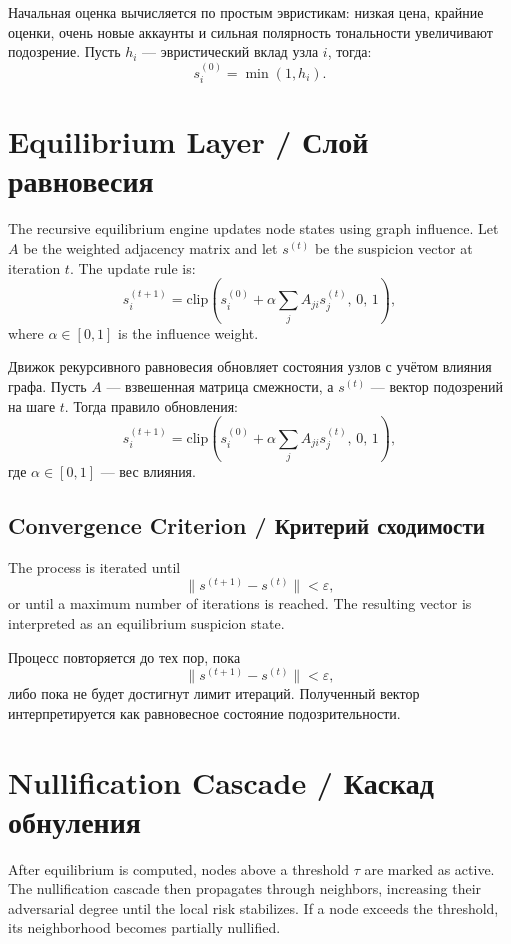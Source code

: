 \documentclass[12pt,a4paper]{article}
\begin{document}
Начальная оценка вычисляется по простым эвристикам:
низкая цена, крайние оценки, очень новые аккаунты и сильная полярность тональности увеличивают подозрение. Пусть $h_i$ — эвристический вклад узла $i$, тогда:
\[
s_i^{(0)} = \min(1, h_i).
\]

\section{Equilibrium Layer / Слой равновесия}

The recursive equilibrium engine updates node states using graph influence. Let $A$ be the weighted adjacency matrix and let $s^{(t)}$ be the suspicion vector at iteration $t$. The update rule is:
\[
s_i^{(t+1)} = \mathrm{clip}\left(s_i^{(0)} + \alpha \sum_j A_{ji}s_j^{(t)},\,0,\,1\right),
\]
where $\alpha \in [0,1]$ is the influence weight.

Движок рекурсивного равновесия обновляет состояния узлов с учётом влияния графа. Пусть $A$ — взвешенная матрица смежности, а $s^{(t)}$ — вектор подозрений на шаге $t$. Тогда правило обновления:
\[
s_i^{(t+1)} = \mathrm{clip}\left(s_i^{(0)} + \alpha \sum_j A_{ji}s_j^{(t)},\,0,\,1\right),
\]
где $\alpha \in [0,1]$ — вес влияния.

\subsection{Convergence Criterion / Критерий сходимости}

The process is iterated until
\[
\|s^{(t+1)} - s^{(t)}\| < \varepsilon,
\]
or until a maximum number of iterations is reached. The resulting vector is interpreted as an equilibrium suspicion state.

Процесс повторяется до тех пор, пока
\[
\|s^{(t+1)} - s^{(t)}\| < \varepsilon,
\]
либо пока не будет достигнут лимит итераций. Полученный вектор интерпретируется как равновесное состояние подозрительности.

\section{Nullification Cascade / Каскад обнуления}

After equilibrium is computed, nodes above a threshold $\tau$ are marked as active. The nullification cascade then propagates through neighbors, increasing their adversarial degree until the local risk stabilizes. If a node exceeds the threshold, its neighborhood becomes partially nullified.
\end{document}
